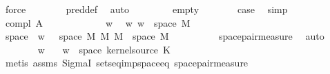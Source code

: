 \begin{isabellebody}
\ force\isanewline
\ \ \ \ \ \ \isamarkupfalse%
\ pred{\isacharunderscore}{\kern0pt}def\ \isamarkupfalse%
\ auto\isanewline
\ \ \isamarkupfalse%
\isanewline
\ \ \ \ \isamarkupfalse%
\ empty\isanewline
\ \ \ \ \isamarkupfalse%
\ \isamarkupfalse%
\ {\isacharquery}{\kern0pt}case\ \isamarkupfalse%
\ simp\isanewline
\ \ \isamarkupfalse%
\isanewline
\ \ \ \ \isamarkupfalse%
\ {\isacharparenleft}{\kern0pt}compl\ A{\isacharparenright}{\kern0pt}\isanewline
\ \ \ \ \isacommand{{\isacharbraceleft}{\kern0pt}}\isamarkupfalse%
\isanewline
\ \ \ \ \ \ \isamarkupfalse%
\ w\ \isamarkupfalse%
\ w{\isacharcolon}{\kern0pt}\ {\isachardoublequoteopen}w\ {\isasymin}\ space\ M{}{\isachardoublequoteclose}\isanewline
\ \ \ \ \ \ \isamarkupfalse%
\ \isamarkupfalse%
\ space{\isacharcolon}{\kern0pt}\ {\isachardoublequoteopen}{\isacharbraceleft}{\kern0pt}{\isasymomega}\ {\isacharparenleft}{\kern0pt}w{\isacharcomma}{\kern0pt}\ {\isasymomega}\ {\isasymin}\ space\ {\isacharparenleft}{\kern0pt}M{}\ {\isasymOtimes}\isactrlsub M\ M{}{\isacharparenright}{\kern0pt}{\isacharbraceright}{\kern0pt}\ {\isacharequal}{\kern0pt}\ space\ M{}{\isachardoublequoteclose}\isanewline
\ \ \ \ \ \ \ \ \isamarkupfalse%
\ space{\isacharunderscore}{\kern0pt}pair{\isacharunderscore}{\kern0pt}measure\ \isamarkupfalse%
\ auto\isanewline
\ \ \ \ \ \ \isamarkupfalse%
\ w\ \isamarkupfalse%
\ {\isachardoublequoteopen}{\isacharparenleft}{\kern0pt}{\isasymomega}\ w{\isacharparenright}{\kern0pt}\ {\isasymin}\ space\ {\isacharparenleft}{\kern0pt}kernel{\isacharunderscore}{\kern0pt}source\ K{\isacharparenright}{\kern0pt}{\isachardoublequoteclose}\isanewline
\ \ \ \ \ \ \ \ \isamarkupfalse%
\ {\isacharparenleft}{\kern0pt}metis\ assms{\isacharparenleft}{\kern0pt}{}{\isacharcomma}{\kern0pt}{}{\isacharparenright}{\kern0pt}\ SigmaI\ sets{\isacharunderscore}{\kern0pt}eq{\isacharunderscore}{\kern0pt}imp{\isacharunderscore}{\kern0pt}space{\isacharunderscore}{\kern0pt}eq\ space{\isacharunderscore}{\kern0pt}pair{\isacharunderscore}{\kern0pt}measure{\isacharparenright}{\kern0pt}\isanewline
\ \ \ \ \ \ \isamarkupfalse%

\end{isabellebody}
